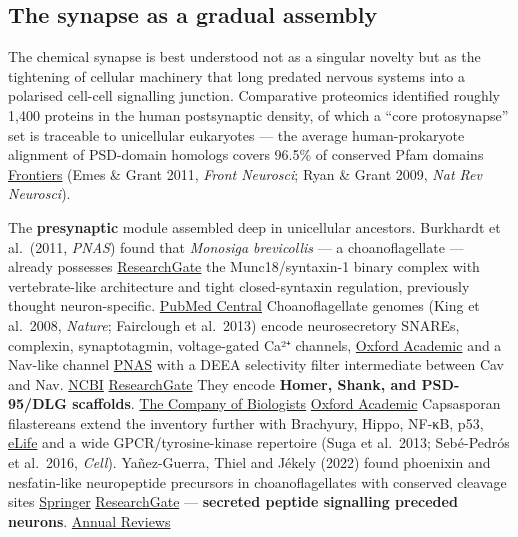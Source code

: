 \subsection{The synapse as a gradual assembly}\label{04_urbilateria-the-synapse-as-a-gradual-assembly}

The chemical synapse is best understood not as a singular novelty but as the tightening of cellular machinery that long predated nervous systems into a polarised cell-cell signalling junction. Comparative proteomics identified roughly 1,400 proteins in the human postsynaptic density, of which a ``core protosynapse'' set is traceable to unicellular eukaryotes --- the average human-prokaryote alignment of PSD-domain homologs covers 96.5\% of conserved Pfam domains \href{https://www.frontiersin.org/journals/neuroscience/articles/10.3389/fnins.2011.00044/full}{Frontiers} (Emes \& Grant 2011, \emph{Front Neurosci}; Ryan \& Grant 2009, \emph{Nat Rev Neurosci}).

The \textbf{presynaptic} module assembled deep in unicellular ancestors. Burkhardt et al.~(2011, \emph{PNAS}) found that \emph{Monosiga brevicollis} --- a choanoflagellate --- already possesses \href{https://www.researchgate.net/publication/272496772_The_origin_and_evolution_of_synaptic_proteins_-_Choanoflagellates_lead_the_way}{ResearchGate} the Munc18/syntaxin-1 binary complex with vertebrate-like architecture and tight closed-syntaxin regulation, previously thought neuron-specific. \href{https://pmc.ncbi.nlm.nih.gov/articles/PMC3174607/}{PubMed Central} Choanoflagellate genomes (King et al.~2008, \emph{Nature}; Fairclough et al.~2013) encode neurosecretory SNAREs, complexin, synaptotagmin, voltage-gated Ca²⁺ channels, \href{https://academic.oup.com/mbe/article/31/9/2342/2925718}{Oxford Academic} and a Nav-like channel \href{https://www.pnas.org/doi/10.1073/pnas.1106363108}{PNAS} with a DEEA selectivity filter intermediate between Cav and Nav. \href{https://www.ncbi.nlm.nih.gov/books/NBK207163/}{NCBI} \href{https://www.researchgate.net/figure/Maximum-likelihood-phylogeny-of-the-voltage-gated-sodium-channel-family-The-common_fig5_227857817}{ResearchGate} They encode \textbf{Homer, Shank, and PSD-95/DLG scaffolds}. \href{https://journals.biologists.com/jeb/article/218/4/506/14126/The-origin-and-evolution-of-synaptic-proteins}{The Company of Biologists} \href{https://academic.oup.com/mbe/article/31/9/2342/2925718}{Oxford Academic} Capsasporan filastereans extend the inventory further with Brachyury, Hippo, NF-κB, p53, \href{https://elifesciences.org/articles/77598}{eLife} and a wide GPCR/tyrosine-kinase repertoire (Suga et al.~2013; Sebé-Pedrós et al.~2016, \emph{Cell}). Yañez-Guerra, Thiel and Jékely (2022) found phoenixin and nesfatin-like neuropeptide precursors in choanoflagellates with conserved cleavage sites \href{https://link.springer.com/article/10.1007/s10071-023-01776-z}{Springer} \href{https://www.researchgate.net/publication/378432679_Evolutionary_origin_of_the_nervous_system_from_Ctenophora_prospective}{ResearchGate} --- \textbf{secreted peptide signalling preceded neurons}. \href{https://www.annualreviews.org/content/journals/10.1146/annurev-cellbio-111822-124041?crawler=true}{Annual Reviews}

